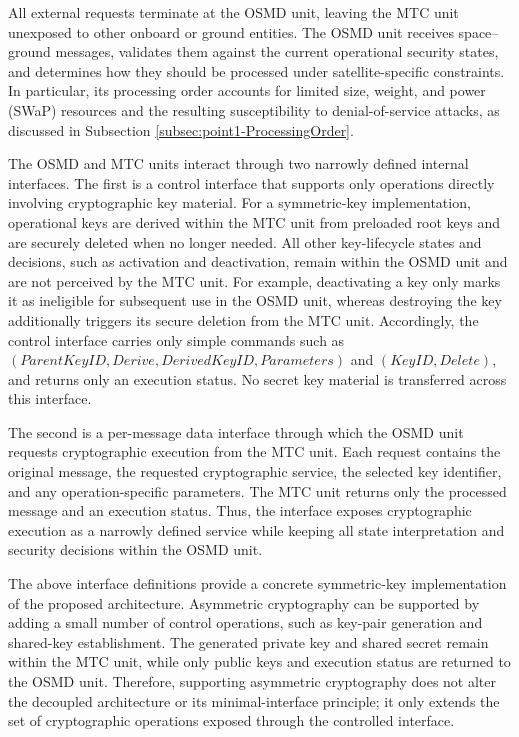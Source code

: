 \documentclass[journal]{IEEEtran}
\begin{document}
All external requests terminate at the OSMD unit, leaving the MTC unit unexposed to other onboard or ground entities.
The OSMD unit receives space--ground messages, validates them against the current operational security states, and determines how they should be processed under satellite-specific constraints.
In particular, its processing order accounts for limited size, weight, and power (SWaP) resources and the resulting susceptibility to denial-of-service attacks, as discussed in Subsection \ref{subsec:point1-ProcessingOrder}.

The OSMD and MTC units interact through two narrowly defined internal interfaces.
The first is a control interface that supports only operations directly involving cryptographic key material.
For a symmetric-key implementation, operational keys are derived within the MTC unit from preloaded root keys and are securely deleted when no longer needed.
All other key-lifecycle states and decisions, such as activation and deactivation, remain within the OSMD unit and are not perceived by the MTC unit.
For example, deactivating a key only marks it as ineligible for subsequent use in the OSMD unit, whereas destroying the key additionally triggers its secure deletion from the MTC unit.
Accordingly, the control interface carries only simple commands such as $(\mathit{ParentKeyID}, \mathit{Derive}, \mathit{DerivedKeyID}, \mathit{Parameters})$ and $(\mathit{KeyID}, \mathit{Delete})$, and returns only an execution status.
No secret key material is transferred across this interface.

The second is a per-message data interface through which the OSMD unit requests cryptographic execution from the MTC unit.
Each request contains the original message, the requested cryptographic service, the selected key identifier, and any operation-specific parameters.
The MTC unit returns only the processed message and an execution status.
Thus, the interface exposes cryptographic execution as a narrowly defined service while keeping all state interpretation and security decisions within the OSMD unit.

The above interface definitions provide a concrete symmetric-key implementation of the proposed architecture.
Asymmetric cryptography can be supported by adding a small number of control operations, such as key-pair generation and shared-key establishment.
The generated private key and shared secret remain within the MTC unit, while only public keys and execution status are returned to the OSMD unit.
Therefore, supporting asymmetric cryptography does not alter the decoupled architecture or its minimal-interface principle; it only extends the set of cryptographic operations exposed through the controlled interface.
\end{document}
